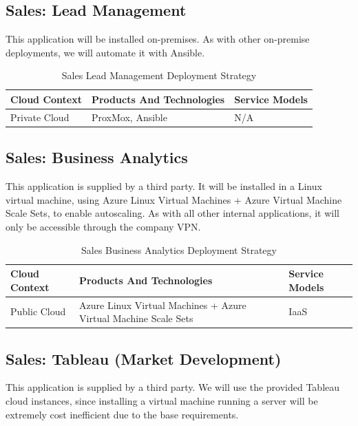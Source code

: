 \documentclass{llncs}
\begin{document}
\subsection{Sales: Lead Management}
This application will be installed on-premises. As with other on-premise deployments, we will automate it with Ansible.
\begin{table}[h!]
    \centering
    \begin{tabular}{lll}
        \hline
        \textbf{Cloud Context} & \textbf{Products And Technologies} & \textbf{Service Models} \\
        \hline
        Private Cloud          & ProxMox, Ansible                   & N/A                     \\
        \hline
    \end{tabular}
    \caption{Sales Lead Management Deployment Strategy}
\end{table}

\subsection{Sales: Business Analytics}
This application is supplied by a third party. It will be installed in a Linux virtual machine, using Azure Linux Virtual Machines + Azure Virtual Machine Scale Sets, to enable autoscaling.
As with all other internal applications, it will only be accessible through the company VPN.\\

\begin{table}[h!]
    \centering
    \begin{tabular}{lll}
        \hline
        \textbf{Cloud Context} & \textbf{Products And Technologies}                              & \textbf{Service Models} \\
        \hline
        Public Cloud           & Azure Linux Virtual Machines + Azure Virtual Machine Scale Sets & IaaS                    \\
    \end{tabular}
    \caption{Sales Business Analytics Deployment Strategy}
\end{table}

\subsection{Sales: Tableau (Market Development)}
This application is supplied by a third party.
We will use the provided Tableau cloud instances, since installing a virtual machine running a server will be extremely cost inefficient due to the base requirements.  \\
\end{document}
